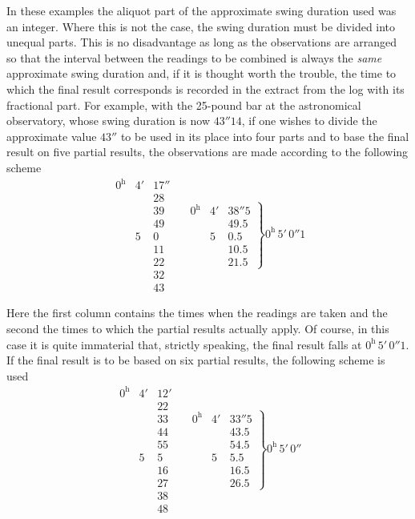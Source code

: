 In these examples the aliquot part of the approximate swing duration used was an integer. Where this is not the case, the swing duration must be divided into unequal parts. This is no disadvantage as long as the observations are arranged so that the interval between the readings to be combined is always the \textit{same} approximate swing duration and, if it is thought worth the trouble, the time to which the final result corresponds is recorded in the extract from the log with its fractional part. For example, with the 25-pound bar at the astronomical observatory, whose swing duration is now $43''14$, if one wishes to divide the approximate value $43''$ to be used in its place into four parts and to base the final result on five partial results, the observations are made according to the following scheme
\[
\begin{array}{rrr|}
0^{\mathrm h}&4'&17''\\
&&28\\
&&39\\
&&49\\
&5&0\\
&&11\\
&&22\\
&&32\\
&&43
\end{array}\quad
\left.\begin{array}{rrr}0^{\mathrm h}&4'&38''5\\&&49.5\\&5&0.5\\&&10.5\\&&21.5\end{array}\right\}0^{\mathrm h}\,5'\,0''1
\]
\par{}\noindent
Here the first column contains the times when the readings are taken and the second the times to which the partial results actually apply. Of course, in this case
it is quite immaterial that, strictly speaking, the final result falls at $0^{\mathrm h}\,5'\,0''1$. If the final result is to be based on six partial results, the following scheme is used
\[
\begin{array}{rrr|}
0^{\mathrm h}&4'&12'\\
&&22\\
&&33\\
&&44\\
&&55\\
&5&5\\
&&16\\
&&27\\
&&38\\
&&48
\end{array}\quad
\left.\begin{array}{rrr}0^{\mathrm h}&4'&33''5\\&&43.5\\&&54.5\\&5&5.5\\&&16.5\\&&26.5\end{array}\right\}0^{\mathrm h}\,5'\,0''
\]

